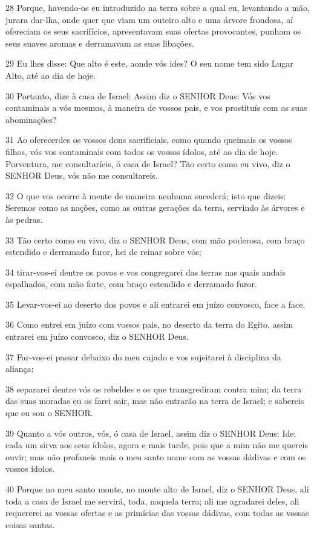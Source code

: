 \par 28 Porque, havendo-os eu introduzido na terra sobre a qual eu, levantando a mão, jurara dar-lha, onde quer que viam um outeiro alto e uma árvore frondosa, aí ofereciam os seus sacrifícios, apresentavam suas ofertas provocantes, punham os seus suaves aromas e derramavam as suas libações.
\par 29 Eu lhes disse: Que alto é este, aonde vós ides? O seu nome tem sido Lugar Alto, até ao dia de hoje.
\par 30 Portanto, dize à casa de Israel: Assim diz o SENHOR Deus: Vós vos contaminais a vós mesmos, à maneira de vossos pais, e vos prostituís com as suas abominações?
\par 31 Ao oferecerdes os vossos dons sacrificiais, como quando queimais os vossos filhos, vós vos contaminais com todos os vossos ídolos, até ao dia de hoje. Porventura, me consultaríeis, ó casa de Israel? Tão certo como eu vivo, diz o SENHOR Deus, vós não me consultareis.
\par 32 O que vos ocorre à mente de maneira nenhuma sucederá; isto que dizeis: Seremos como as nações, como as outras gerações da terra, servindo às árvores e às pedras.
\par 33 Tão certo como eu vivo, diz o SENHOR Deus, com mão poderosa, com braço estendido e derramado furor, hei de reinar sobre vós;
\par 34 tirar-vos-ei dentre os povos e vos congregarei das terras nas quais andais espalhados, com mão forte, com braço estendido e derramado furor.
\par 35 Levar-vos-ei ao deserto dos povos e ali entrarei em juízo convosco, face a face.
\par 36 Como entrei em juízo com vossos pais, no deserto da terra do Egito, assim entrarei em juízo convosco, diz o SENHOR Deus.
\par 37 Far-vos-ei passar debaixo do meu cajado e vos sujeitarei à disciplina da aliança;
\par 38 separarei dentre vós os rebeldes e os que transgrediram contra mim; da terra das suas moradas eu os farei sair, mas não entrarão na terra de Israel; e sabereis que eu sou o SENHOR.
\par 39 Quanto a vós outros, vós, ó casa de Israel, assim diz o SENHOR Deus: Ide; cada um sirva aos seus ídolos, agora e mais tarde, pois que a mim não me quereis ouvir; mas não profaneis mais o meu santo nome com as vossas dádivas e com os vossos ídolos.
\par 40 Porque no meu santo monte, no monte alto de Israel, diz o SENHOR Deus, ali toda a casa de Israel me servirá, toda, naquela terra; ali me agradarei deles, ali requererei as vossas ofertas e as primícias das vossas dádivas, com todas as vossas coisas santas.
